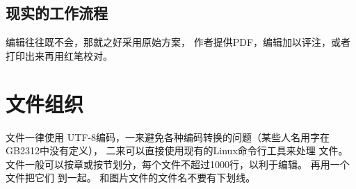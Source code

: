 \subsection{现实的工作流程}
编辑往往既不会，那就之好采用原始方案，
作者提供PDF，编辑加以评注，或者打印出来再用红笔校对。

\section{ 文件组织}
 文件一律使用 UTF-8编码，一来避免各种编码转换的问题（某些人名用字在GB2312中没有定义），
二来可以直接使用现有的Linux命令行工具来处理  文件。
 文件一般可以按章或按节划分，每个文件不超过1000行，以利于编辑。
再用一个  文件把它们  到一起。
 和图片文件的文件名不要有下划线。
